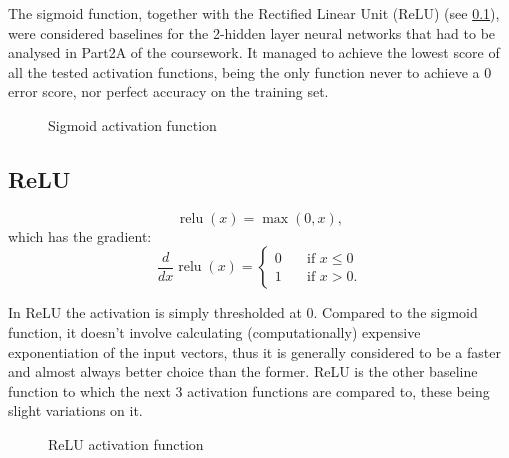 \documentclass{article}
\DeclareMathOperator{\relu}{relu}
\begin{document}
The sigmoid function, together with the Rectified Linear Unit (ReLU) (see \ref{sec:relu}), were considered baselines for the 2-hidden layer neural networks that had to be analysed in Part2A of the coursework. It managed to achieve the lowest score of all the tested activation functions, being the only function never to achieve a 0 error score, nor perfect accuracy on the training set.

\begin{figure}[H]
    \centering
    \begin{subfigure}{}
      
    \end{subfigure}
    \begin{subfigure}{}
      
    \end{subfigure}
    \caption{Sigmoid activation function}
\end{figure}


\subsection{ReLU}\label{sec:relu}
\begin{equation}
  \relu(x) = \max(0, x) ,
\end{equation} 
which has the gradient:
\begin{equation}
  \frac{d}{dx} \relu(x) =
     \begin{cases} 
      0      & \quad \text{if } x \leq  0 \\
      1      & \quad \text{if } x > 0 .
    \end{cases} 
\end{equation}

In ReLU the activation is simply thresholded at 0. Compared to the sigmoid function, it doesn't involve calculating (computationally) expensive exponentiation of the input vectors, thus it is generally considered to be a faster and almost always better choice than the former. ReLU is the other baseline function to which the next 3 activation functions are compared to, these being slight variations on it.

\begin{figure}[H]
    \centering
    \begin{subfigure}{}
      
    \end{subfigure}
    \begin{subfigure}{}
      
    \end{subfigure}
    \caption{ReLU activation function}
\end{figure}
\end{document}
